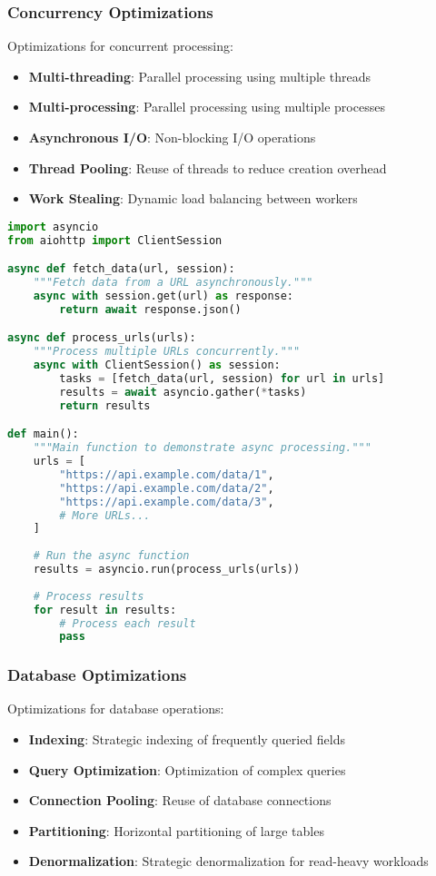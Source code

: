 \subsubsection{Concurrency Optimizations}
Optimizations for concurrent processing:

\begin{itemize}
    \item \textbf{Multi-threading}: Parallel processing using multiple threads
    \item \textbf{Multi-processing}: Parallel processing using multiple processes
    \item \textbf{Asynchronous I/O}: Non-blocking I/O operations
    \item \textbf{Thread Pooling}: Reuse of threads to reduce creation overhead
    \item \textbf{Work Stealing}: Dynamic load balancing between workers
\end{itemize}

\begin{lstlisting}[language=python, caption=Asynchronous Processing]
import asyncio
from aiohttp import ClientSession

async def fetch_data(url, session):
    """Fetch data from a URL asynchronously."""
    async with session.get(url) as response:
        return await response.json()

async def process_urls(urls):
    """Process multiple URLs concurrently."""
    async with ClientSession() as session:
        tasks = [fetch_data(url, session) for url in urls]
        results = await asyncio.gather(*tasks)
        return results

def main():
    """Main function to demonstrate async processing."""
    urls = [
        "https://api.example.com/data/1",
        "https://api.example.com/data/2",
        "https://api.example.com/data/3",
        # More URLs...
    ]
    
    # Run the async function
    results = asyncio.run(process_urls(urls))
    
    # Process results
    for result in results:
        # Process each result
        pass
\end{lstlisting}

\subsubsection{Database Optimizations}
Optimizations for database operations:

\begin{itemize}
    \item \textbf{Indexing}: Strategic indexing of frequently queried fields
    \item \textbf{Query Optimization}: Optimization of complex queries
    \item \textbf{Connection Pooling}: Reuse of database connections
    \item \textbf{Partitioning}: Horizontal partitioning of large tables
    \item \textbf{Denormalization}: Strategic denormalization for read-heavy workloads
\end{itemize}

